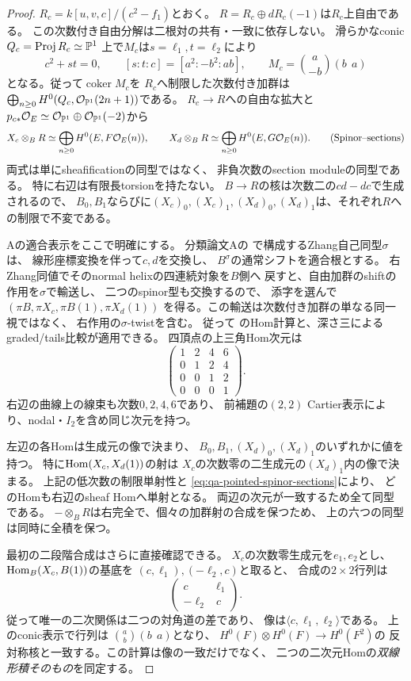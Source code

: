 \begin{proof}
$R_c=k[u,v,c]/(c^2-f_1)$とおく。
$R=R_c\oplus dR_c(-1)$は$R_c$上自由である。
この次数付き自由分解は二根対の共有・一致に依存しない。
滑らかなconic $Q_c=\operatorname{Proj}R_c\simeq\mathbb P^1$
上で$M_c$は$s=\ell_1,t=\ell_2$により
\[
c^2+st=0,\qquad
[s:t:c]=[a^2:-b^2:ab],\qquad
M_c=\binom{a}{-b}(b\ \ a)
\]
となる。従って$\operatorname{coker}M_c$を
$R_c$へ制限した次数付き加群は
$\bigoplus_{n\ge0}H^0(Q_c,\mathcal O_{\mathbb P^1}(2n+1))$である。
$R_c\to R$への自由な拡大と
$p_{c*}\mathcal O_E\simeq\mathcal O_{\mathbb P^1}\oplus\mathcal O_{\mathbb P^1}(-2)$から
\[
X_c\otimes_B R
 \simeq\bigoplus_{n\ge0}H^0(E,F\mathcal O_E(n)),
\qquad
X_d\otimes_B R
 \simeq\bigoplus_{n\ge0}H^0(E,G\mathcal O_E(n)).
\tag{Spinor--sections}\label{eq:qa-pointed-spinor-sections}
\]
両式は単にsheafificationの同型ではなく、
非負次数のsection moduleの同型である。
特に右辺は有限長torsionを持たない。
$B\to R$の核は次数二の$cd-dc$で生成されるので、
$B_0,B_1$ならびに$(X_c)_0,(X_c)_1,
(X_d)_0,(X_d)_1$は、それぞれ$R$への制限で不変である。

Aの適合表示をここで明確にする。
分類論文Aの
\cite[\texttt{thm:ore-anticommuting-central}]{QuadricIntrinsic2026}
で構成するZhang自己同型$\sigma$は、
線形座標変換を伴って$c,d$を交換し、
$B^\sigma$の通常シフトを適合根とする。
右Zhang同値でそのnormal helixの四連続対象を$B$側へ
戻すと、自由加群のshiftの作用を$\sigma$で輸送し、
二つのspinor型も交換するので、
添字を選んで
$(\pi B,\pi X_c,\pi B(1),\pi X_d(1))$
を得る。この輸送は次数付き加群の単なる同一視ではなく、
右作用の$\sigma$-twistを含む。
従って
\cite[\texttt{thm:normal-helix},
\texttt{cor:normal-cubic-defect}]{QuadricIntrinsic2026}
のHom計算と、深さ三によるgraded/tails比較が適用できる。
四頂点の上三角Hom次元は
\[
\begin{pmatrix}
1&2&4&6\\0&1&2&4\\0&0&1&2\\0&0&0&1
\end{pmatrix}.
\tag{Four-End-dims}\label{eq:qa-pointed-four-end-dimensions}
\]
右辺の曲線上の線束も次数$0,2,4,6$であり、
前補題の$(2,2)$ Cartier表示により、nodal・$I_2$を含め同じ次元を持つ。

左辺の各Homは生成元の像で決まり、
$B_0,B_1,(X_d)_0,(X_d)_1$のいずれかに値を持つ。
特に$\operatorname{Hom}(X_c,X_d(1))$の射は
$X_c$の次数零の二生成元の$(X_d)_1$内の像で決まる。
上記の低次数の制限単射性と
\eqref{eq:qa-pointed-spinor-sections}により、
どのHomも右辺のsheaf Homへ単射となる。
両辺の次元が一致するため全て同型である。
$-\otimes_B R$は右完全で、個々の加群射の合成を保つため、
上の六つの同型は同時に全積を保つ。

最初の二段階合成はさらに直接確認できる。
$X_c$の次数零生成元を$e_1,e_2$とし、
$\operatorname{Hom}_B(X_c,B(1))$の基底を
$(c,\ell_1),(-\ell_2,c)$と取ると、
合成の$2\times2$行列は
\[
\begin{pmatrix}
c&\ell_1\\-\ell_2&c
\end{pmatrix}.
\]
従って唯一の二次関係は二つの対角道の差であり、
像は$\langle c,\ell_1,\ell_2\rangle$である。
上のconic表示で行列は
$\binom{a}{b}(b\ \ a)$となり、
$H^0(F)\otimes H^0(F)\to H^0(F^2)$の
反対称核と一致する。この計算は像の一致だけでなく、
二つの二次元Homの\emph{双線形積そのもの}を同定する。
\end{proof}

